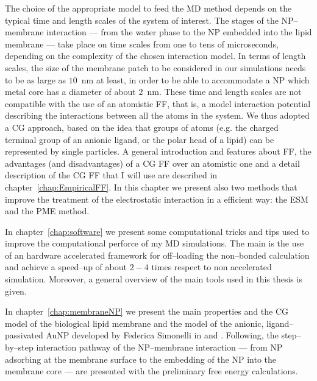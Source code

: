 The choice of the appropriate model to feed the \ac{MD} method depends on the typical time and length scales of the system of interest. The stages of the \ac{NP}--membrane interaction --- from the water phase to the \ac{NP} embedded into the lipid membrane  --- take place on time scales from one to tens of microseconds, depending on the complexity of the chosen interaction model. In terms of length scales, the size of the membrane patch to be considered in our simulations needs to be as large as $10$~nm at least, in order to be able to accommodate a \ac{NP} which metal core has a diameter of about $2$~nm. These time and length scales are not compatible with the use of an atomistic \ac{FF}, that is, a model interaction potential describing the interactions between all the atoms in the system. We thus adopted a \ac{CG} approach, based on the idea that groups of atoms (e.g. the charged terminal group of an anionic ligand, or the polar head of a lipid) can be represented by single particles. A general introduction and features about \ac{FF}, the advantages (and disadvantages) of a \ac{CG} \ac{FF} over an atomistic one and a detail description of the \ac{CG} \ac{FF} that I will use are described in chapter~\ref{chap:EmpiricalFF}. In this chapter we present also two methods that improve the treatment of the electrostatic interaction in a efficient way: the \ac{ESM} and the \ac{PME} method. 

In chapter~\ref{chap:software} we present some computational tricks and tips used to improve the computational perforce of my \ac{MD} simulations. The main is the use of an hardware accelerated framework for off--loading the non--bonded calculation and achieve a speed--up of about $2-4$ times respect to non accelerated simulation. Moreover, a general overview of the main tools used in this thesis is given.

In chapter~\ref{chap:membraneNP} we present the main properties and the \ac{CG} model of the biological lipid membrane and the model of the anionic, ligand--passivated \ac{AuNP} developed by Federica Simonelli \etal in \cite{simonelliThesis} and \cite{ourPaper}. Following, the step--by--step interaction pathway of the \ac{NP}--membrane interaction --- from \ac{NP} adsorbing at the membrane surface to the embedding of the \ac{NP} into the membrane core --- are presented with the preliminary free energy calculations.

